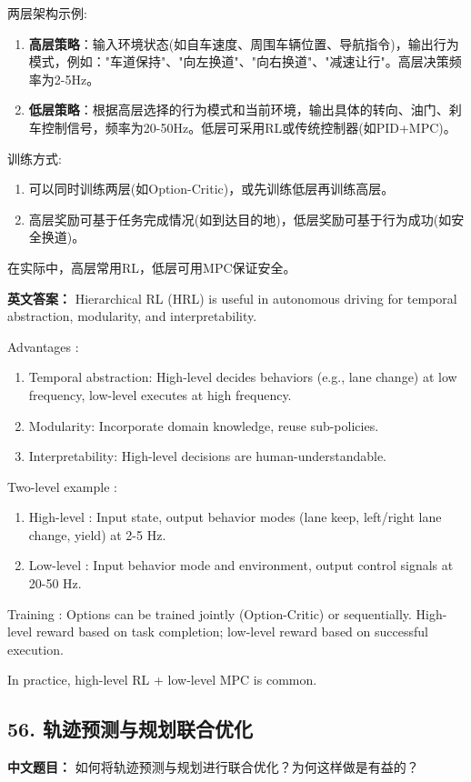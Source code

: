 \documentclass[10pt,a4paper]{ctexart}
\begin{document}
 两层架构示例:
\begin{enumerate}
    \item \textbf{高层策略}：输入环境状态(如自车速度、周围车辆位置、导航指令)，输出行为模式，例如："车道保持"、"向左换道"、"向右换道"、"减速让行"。高层决策频率为2-5Hz。
    \item \textbf{低层策略}：根据高层选择的行为模式和当前环境，输出具体的转向、油门、刹车控制信号，频率为20-50Hz。低层可采用RL或传统控制器(如PID+MPC)。
\end{enumerate}

 训练方式:
\begin{enumerate}
    \item 可以同时训练两层(如Option-Critic)，或先训练低层再训练高层。
    \item 高层奖励可基于任务完成情况(如到达目的地)，低层奖励可基于行为成功(如安全换道)。
\end{enumerate}

在实际中，高层常用RL，低层可用MPC保证安全。

\textbf{英文答案：}  
Hierarchical RL (HRL) is useful in autonomous driving for temporal abstraction, modularity, and interpretability.

 Advantages :
\begin{enumerate}
    \item Temporal abstraction: High-level decides behaviors (e.g., lane change) at low frequency, low-level executes at high frequency.
    \item Modularity: Incorporate domain knowledge, reuse sub-policies.
    \item Interpretability: High-level decisions are human-understandable.
\end{enumerate}

 Two-level example :
\begin{enumerate}
    \item High-level : Input state, output behavior modes (lane keep, left/right lane change, yield) at 2-5 Hz.
    \item Low-level : Input behavior mode and environment, output control signals at 20-50 Hz.
\end{enumerate}

 Training : Options can be trained jointly (Option-Critic) or sequentially. High-level reward based on task completion; low-level reward based on successful execution.

In practice, high-level RL + low-level MPC is common.

\subsection*{56. 轨迹预测与规划联合优化}
\textbf{中文题目：} 如何将轨迹预测与规划进行联合优化？为何这样做是有益的？
\end{document}

